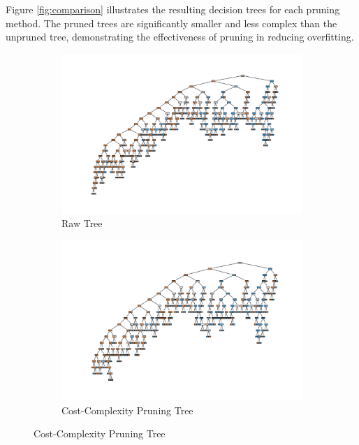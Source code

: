 \documentclass[12pt]{article}
\begin{document}
Figure \ref{fig:comparison} illustrates the resulting decision trees for each pruning method. The pruned trees are significantly smaller and less complex than the unpruned tree, demonstrating the effectiveness of pruning in reducing overfitting.

\begin{figure}[htbp]
    \centering
    \begin{subfigure}{0.45\textwidth}
        \centering
        \includegraphics[width=\linewidth]{figures/Reduced Error Pruning/raw_tree.png}
        \caption{Raw Tree}
        \label{fig:method1}
    \end{subfigure}
    \hfill
    \begin{subfigure}{0.45\textwidth}
        \centering
        \includegraphics[width=\linewidth]{figures/Reduced Error Pruning/ccp tree.png}
        \caption{Cost-Complexity Pruning Tree}
        \label{fig:method2}
    \end{subfigure}
    

\end{figure}
\end{document}
